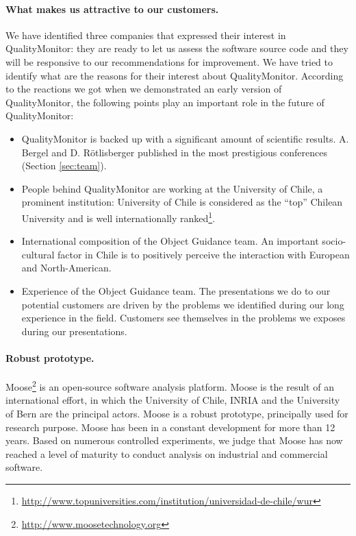 \documentclass[runningheads]{llncs}
\newcommand{\secref}[1]{Section \ref{sec:#1}}
\begin{document}
\paragraph{What makes us attractive to our customers. }
We have identified three companies that expressed their interest in QualityMonitor: they are ready to let us assess the software source code and they will be responsive to our recommendations for improvement. 
We have tried to identify what are the reasons for their interest about QualityMonitor. According to the reactions we got when we demonstrated an early version of QualityMonitor, the following points play an important role in the future of QualityMonitor:
\begin{itemize}
\item QualityMonitor is backed up with a significant amount of scientific results. A. Bergel and D. R\"otlisberger published in the most prestigious conferences (\secref{team}).
\item People behind QualityMonitor are working at the University of Chile, a prominent institution: University of Chile is considered as the ``top'' Chilean University and is well internationally ranked\footnote{\url{http://www.topuniversities.com/institution/universidad-de-chile/wur}}.
\item International composition of the Object Guidance team. An important socio-cultural factor in Chile is to positively perceive the interaction with European and North-American.
\item Experience of the Object Guidance team. The presentations we do to our potential customers are driven by the problems we identified during our long experience in the field. Customers see themselves in the problems we exposes during our presentations.
\end{itemize}


\paragraph{Robust prototype.}
Moose\footnote{\url{http://www.moosetechnology.org}} is an open-source software analysis platform. Moose is the result of an international effort, in which the University of Chile, INRIA and the University of Bern are the principal actors. Moose is a robust prototype, principally used for research purpose. Moose has been in a constant development for more than 12 years. Based on numerous controlled experiments, we judge that Moose has now reached a level of maturity to conduct analysis on industrial and commercial software. 
\end{document}
